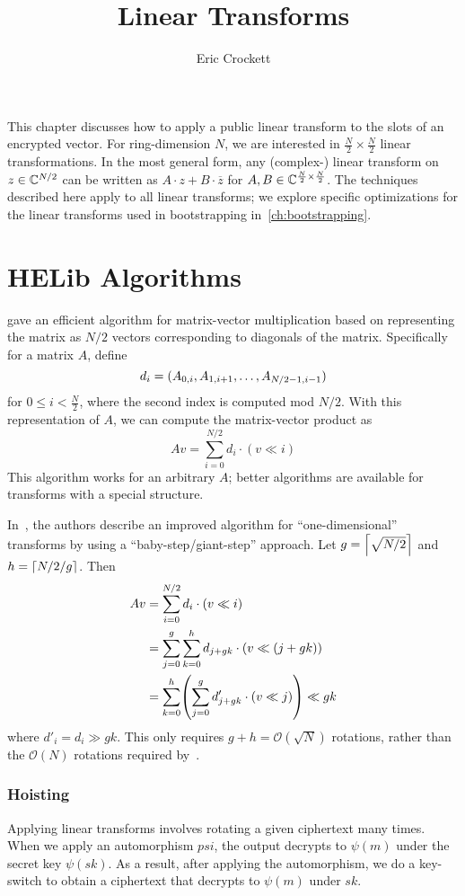 \documentclass[../fheimpl.tex]{subfiles}
\title{Linear Transforms}
\author{Eric Crockett}
\begin{document}
    \ifcompileasbook
    \else
	\maketitle
	\listoffixmes
    \fi
	
	This chapter discusses how to apply a public linear transform to the slots of an encrypted vector. For ring-dimension $N$, we are interested in $\frac{N}{2}\times\frac{N}{2}$ linear transformations. In the most general form, any (complex-) linear transform on $z\in \C^{N/2}$ can be written as $A\cdot z+B\cdot \overline{z}$ for $A,B\in\C^{\frac{N}{2}\times\frac{N}{2}}$. The techniques described here apply to all linear transforms; we explore specific optimizations for the linear transforms used in bootstrapping in~\cref{ch:bootstrapping}.
	
	\section{HELib Algorithms}
	\label{sec:helibmatmulalgs}
	\cite{cryptoeprint:2014/106} gave an efficient algorithm for matrix-vector multiplication based on representing the matrix as $N/2$ vectors corresponding to diagonals of the matrix. Specifically for a matrix $A$, define 
	\[d_i = \parens{A_{0, i}, A_{1, i+1}, \ldots, A_{N/2-1, i-1}}\]
	for $0\le i < \frac{N}{2}$, where the second index is computed mod $N/2$. With this representation of $A$, we can compute the matrix-vector product as
	\[Av = \sum_{i=0}^{N/2} d_i\cdot (v \ll i)\]
	This algorithm works for an arbitrary $A$; better algorithms are available for transforms with a special structure.
	
	In~\cite{cryptoeprint:2018/244}, the authors describe an improved algorithm for ``one-dimensional'' transforms by using a ``baby-step/giant-step'' approach. Let $g=\ceil*{\sqrt{N/2}}$ and $h=\ceil*{N/2/g}$. Then
	\begin{align*}
		Av &= \sum_{i=0}^{N/2} d_i\cdot (v \ll i) \\
		   &= \sum_{j=0}^g\sum_{k=0}^h d_{j+gk}\cdot  (v \ll (j+gk)) \\
		   &= \sum_{k=0}^h\parens*{\sum_{j=0}^g d'_{j+gk}\cdot (v \ll j)}\ll gk
	\end{align*}
	where $d'_i = d_i \gg gk$. This only requires $g+h = \mathcal{O}(\sqrt{N})$ rotations, rather than the $\mathcal{O}(N)$ rotations required by~\cite{cryptoeprint:2014/106}.
	
    \subsubsection{Hoisting}
    Applying linear transforms involves rotating a given ciphertext many times. When we apply an automorphism $psi$, the output decrypts to $\psi(m)$ under the secret key $\psi(sk)$. As a result, after applying the automorphism, we do a key-switch to obtain a ciphertext that decrypts to $\psi(m)$ under $sk$. 
	
\end{document}
